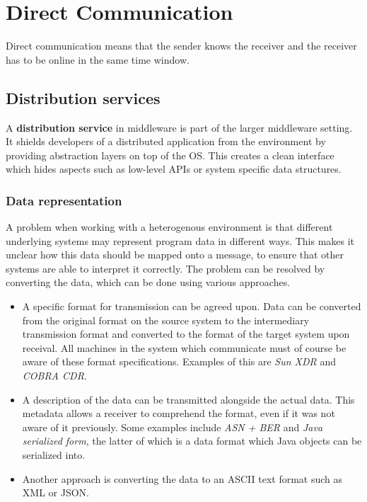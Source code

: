\documentclass[a4paper]{article}
\begin{document}
\newpage

\section{Direct Communication}

Direct communication means that the sender knows the receiver and the receiver has to be online in the same time window.

\subsection{Distribution services}

A \textbf{distribution service} in middleware is part of the larger middleware setting. It shields developers of a distributed application from the environment by providing abstraction layers on top of the OS. This creates a clean interface which hides aspects such as low-level APIs or system specific data structures.

\subsubsection{Data representation}

A problem when working with a heterogenous environment is that different underlying systems may represent program data in different ways. This makes it unclear how this data should be mapped onto a message, to ensure that other systems are able to interpret it correctly. The problem can be resolved by converting the data, which can be done using various approaches.

\begin{itemize}
\item A specific format for transmission can be agreed upon. Data can be converted from the original format on the source system to the intermediary transmission format and converted to the format of the target system upon receival. All machines in the system which communicate must of course be aware of these format specifications. Examples of this are \textit{Sun XDR} and \textit{COBRA CDR}.
\item A description of the data can be transmitted alongside the actual data. This metadata allows a receiver to comprehend the format, even if it was not aware of it previously. Some examples include \textit{ASN + BER} and \textit{Java serialized form}, the latter of which is a data format which Java objects can be serialized into.
\item Another approach is converting the data to an ASCII text format such as XML or JSON.
\end{itemize}
\end{document}
